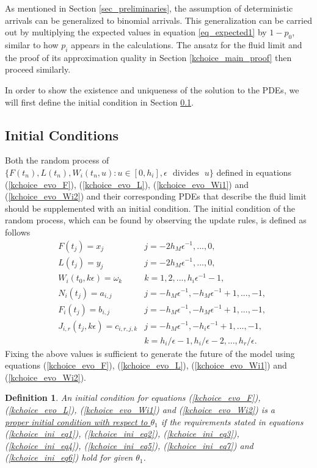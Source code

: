 \documentclass[12pt]{article}
\numberwithin{equation}{section}  %
\newtheorem{defn}[thm]{Definition}
\begin{document}
As mentioned in Section \ref{sec_preliminaries}, the assumption of deterministic arrivals can be generalized to binomial arrivals. This generalization can be carried out by multiplying the expected values in equation \eqref{eq_expected1} by $1-p_0$, similar to how $p_i$ appears in the calculations. The ansatz for the fluid limit and the proof of its approximation quality in Section \ref{kchoice_main_proof} then proceed similarly.

In order to show the existence and uniqueness of the solution to the PDEs, we will first define the initial condition in Section \ref{kchoice_section_initial}.


\subsection{Initial Conditions}\label{kchoice_section_initial}
Both the random process of $\{F(t_n),L(t_n), W_{i}(t_n,u):u\in[0,h_i], \epsilon \text{ {divides} } u\}$ defined in equations (\ref{kchoice_evo_F}), (\ref{kchoice_evo_L}), (\ref{kchoice_evo_Wi1}) and (\ref{kchoice_evo_Wi2}) and their corresponding PDEs that describe the fluid limit should be supplemented with an initial condition. The initial condition of the random process, which can be found by observing the update rules, is defined as follows
\begin{align*}
&F(t_j)=x_j&j=-2h_M\epsilon^{-1},...,0,\\
&L(t_j)=y_j&j=-2h_M\epsilon^{-1},...,0,\\
&W_i(t_0,k\epsilon)=\omega_k   &k=1,2,..., h_i\epsilon^{-1}-1,\\
&N_i(t_j)=a_{i,j}  &j=-h_M\epsilon^{-1},-h_M\epsilon^{-1}+1,...,-1,\\
&F_i(t_j)=b_{i,j}&j=-h_M\epsilon^{-1},-h_M\epsilon^{-1}+1,...,-1,\\
&J_{i,r}(t_j,k\epsilon)=c_{i,r,j,k}   &j=-h_M\epsilon^{-1},-h_i\epsilon^{-1}+1,...,-1,\\
&&k=h_i/\epsilon-1,h_i/\epsilon-2,...,h_r/\epsilon.
\end{align*} 
Fixing the above values is sufficient to generate the future of the model using equations (\ref{kchoice_evo_F}), (\ref{kchoice_evo_L}), (\ref{kchoice_evo_Wi1}) and (\ref{kchoice_evo_Wi2}).

\begin{defn}
An initial condition for equations (\ref{kchoice_evo_F}), (\ref{kchoice_evo_L}), (\ref{kchoice_evo_Wi1}) and (\ref{kchoice_evo_Wi2}) is a\\
\underline{proper initial condition with respect to $\theta_1$} if the requirements stated in equations (\ref{kchoice_ini_eq1}), (\ref{kchoice_ini_eq2}), (\ref{kchoice_ini_eq3}), (\ref{kchoice_ini_eq4}), (\ref{kchoice_ini_eq5}), (\ref{kchoice_ini_eq7}) and (\ref{kchoice_ini_eq6}) hold for given $\theta_1$. 
\end{defn}
\end{document}
